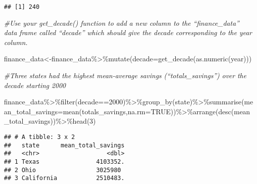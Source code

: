 \documentclass[
]{article}
\newenvironment{Shaded}{\begin{snugshade}}{\end{snugshade}}
\newcommand{\AttributeTok}[1]{\textcolor[rgb]{0.77,0.63,0.00}{#1}}
\newcommand{\CommentTok}[1]{\textcolor[rgb]{0.56,0.35,0.01}{\textit{#1}}}
\newcommand{\ConstantTok}[1]{\textcolor[rgb]{0.00,0.00,0.00}{#1}}
\newcommand{\DecValTok}[1]{\textcolor[rgb]{0.00,0.00,0.81}{#1}}
\newcommand{\FunctionTok}[1]{\textcolor[rgb]{0.00,0.00,0.00}{#1}}
\newcommand{\NormalTok}[1]{#1}
\newcommand{\OtherTok}[1]{\textcolor[rgb]{0.56,0.35,0.01}{#1}}
\newcommand{\SpecialCharTok}[1]{\textcolor[rgb]{0.00,0.00,0.00}{#1}}
\begin{document}
\begin{verbatim}
## [1] 240
\end{verbatim}

\begin{Shaded}
\begin{Highlighting}[]
\CommentTok{\#Use your get\_decade() function to add a new column to the “finance\_data” data frame called “decade” which should give the decade corresponding to the year column.}

\NormalTok{finance\_data}\OtherTok{\textless{}{-}}\NormalTok{finance\_data}\SpecialCharTok{\%\textgreater{}\%}\FunctionTok{mutate}\NormalTok{(}\AttributeTok{decade=}\FunctionTok{get\_decade}\NormalTok{(}\FunctionTok{as.numeric}\NormalTok{(year)))}

\CommentTok{\#Three states had the highest mean{-}average savings (“totals\_savings”) over the decade starting 2000}

\NormalTok{finance\_data}\SpecialCharTok{\%\textgreater{}\%}\FunctionTok{filter}\NormalTok{(decade}\SpecialCharTok{==}\DecValTok{2000}\NormalTok{)}\SpecialCharTok{\%\textgreater{}\%}\FunctionTok{group\_by}\NormalTok{(state)}\SpecialCharTok{\%\textgreater{}\%}\FunctionTok{summarise}\NormalTok{(}\AttributeTok{mean\_total\_savings=}\FunctionTok{mean}\NormalTok{(totals\_savings,}\AttributeTok{na.rm=}\ConstantTok{TRUE}\NormalTok{))}\SpecialCharTok{\%\textgreater{}\%}\FunctionTok{arrange}\NormalTok{(}\FunctionTok{desc}\NormalTok{(mean\_total\_savings))}\SpecialCharTok{\%\textgreater{}\%}\FunctionTok{head}\NormalTok{(}\DecValTok{3}\NormalTok{)}
\end{Highlighting}
\end{Shaded}

\begin{verbatim}
## # A tibble: 3 x 2
##   state      mean_total_savings
##   <chr>                   <dbl>
## 1 Texas                4103352.
## 2 Ohio                 3025980 
## 3 California           2510483.
\end{verbatim}
\end{document}

